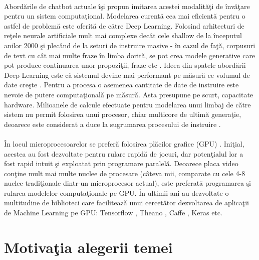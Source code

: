 \paragraph{}
Abord\u arile de chatbot actuale \^ i\c si propun imitarea acestei modalit\u a\c ti de \^ inv\u a\c tare pentru un sistem computa\c tional. Modelarea curent\u a cea mai eficient\u a pentru o astfel de problem\u a este oferit\u a de c\u atre Deep Learning. Folosind arhitecturi de re\c tele neurale artificiale mult mai complexe dec\^ at cele shallow de la \^ inceputul anilor 2000 \c si plec\^ and de la seturi de instruire masive - \^ in cazul de fa\c t\u a, corpusuri de text cu c\^ at mai multe fraze \^ in limba dorit\u a, se pot crea modele generative care pot produce continuarea unor propozi\c tii, fraze etc \cite{wildml-chatbots}. Ideea din spatele abord\u arii Deep Learning este c\u a sistemul devine mai performant pe m\u asur\u a ce volumul de date cre\c ste \cite{deep-learning-mode-data}. Pentru a procesa o asemenea cantitate de date de instruire este nevoie de putere computa\c tional\u a pe m\u asur\u a. Asta presupune pe scurt, capacitate hardware. Milioanele de calcule efectuate pentru modelarea unui limbaj de c\u atre sistem nu permit folosirea unui procesor, chiar multicore de ultim\u a genera\c tie, deoarece este considerat a duce la sugrumarea procesului de instruire \cite{cpu-failure}.

\paragraph{}
\^ In locul microprocesoarelor se prefer\u a folosirea pl\u acilor grafice (GPU) \cite{cpu-vs-gpu}. Ini\c tial, acestea au fost dezvoltate pentru rulare rapid\u a de jocuri, dar poten\c tialul lor a fost rapid intuit \c si exploatat prin programare paralel\u a. Deoarece placa video con\c tine mult mai multe nuclee de procesare (c\^ ateva mii, comparate cu cele 4-8 nuclee tradi\c tionale dintr-un microprocesor actual), este preferat\u a programarea \c si rularea modelelor computa\c tionale pe GPU. \^ In ultimii ani au dezvoltate o multitudine de biblioteci care faciliteaz\u a unui cercet\u ator dezvoltarea de aplica\c tii de Machine Learning pe GPU: Tensorflow \cite{DBLP:journals/corr/AbadiABBCCCDDDG16}, Theano \cite{2016arXiv160502688short}, Caffe \cite{jia2014caffe}, Keras \cite{chollet2015keras} etc.

\section{Motiva\c tia alegerii temei}

